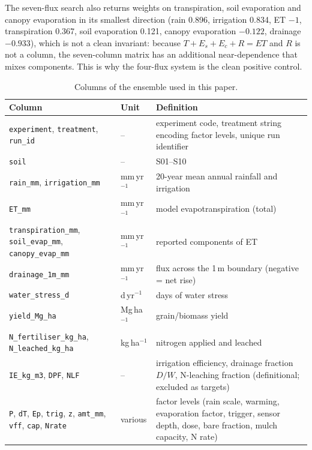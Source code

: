 \documentclass[preprint,12pt,authoryear]{elsarticle}
\begin{document}
The seven-flux search also returns weights on transpiration, soil evaporation and canopy evaporation in its smallest direction (rain 0.896, irrigation 0.834, ET $-1$, transpiration 0.367, soil evaporation 0.121, canopy evaporation $-0.122$, drainage $-0.933$), which is not a clean invariant: because $T+E_s+E_c+R=\mathit{ET}$ and $R$ is not a column, the seven-column matrix has an additional near-dependence that mixes components. This is why the four-flux system is the clean positive control.

\begin{table}[H]\centering\small
\caption{Columns of the ensemble used in this paper.}
\begin{tabularx}{\textwidth}{llX}
\toprule
Column & Unit & Definition\\\midrule
\texttt{experiment}, \texttt{treatment}, \texttt{run\_id} & -- & experiment code, treatment string encoding factor levels, unique run identifier\\
\texttt{soil} & -- & S01--S10\\
\texttt{rain\_mm}, \texttt{irrigation\_mm} & mm\,yr$^{-1}$ & 20-year mean annual rainfall and irrigation\\
\texttt{ET\_mm} & mm\,yr$^{-1}$ & model evapotranspiration (total)\\
\texttt{transpiration\_mm}, \texttt{soil\_evap\_mm}, \texttt{canopy\_evap\_mm} & mm\,yr$^{-1}$ & reported components of ET\\
\texttt{drainage\_1m\_mm} & mm\,yr$^{-1}$ & flux across the 1\,m boundary (negative = net rise)\\
\texttt{water\_stress\_d} & d\,yr$^{-1}$ & days of water stress\\
\texttt{yield\_Mg\_ha} & Mg\,ha$^{-1}$ & grain/biomass yield\\
\texttt{N\_fertiliser\_kg\_ha}, \texttt{N\_leached\_kg\_ha} & kg\,ha$^{-1}$ & nitrogen applied and leached\\
\texttt{IE\_kg\_m3}, \texttt{DPF}, \texttt{NLF} & -- & irrigation efficiency, drainage fraction $D/W$, N-leaching fraction (definitional; excluded as targets)\\
\texttt{P}, \texttt{dT}, \texttt{Ep}, \texttt{trig}, \texttt{z}, \texttt{amt\_mm}, \texttt{vff}, \texttt{cap}, \texttt{Nrate} & various & factor levels (rain scale, warming, evaporation factor, trigger, sensor depth, dose, bare fraction, mulch capacity, N rate)\\
\bottomrule
\end{tabularx}
\end{table}
\end{document}
